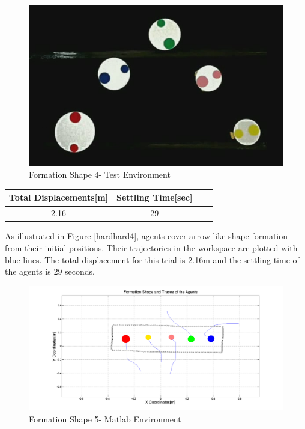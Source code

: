 \begin{figure}[H]
\caption{Formation Shape 4- Test Environment}
\centerline{\includegraphics[scale = 0.35]{6_real_hardware}}
\end{figure} 
					
\begin{center}
 \label{hardwareshape4_ref} 
\begin{tabular}{||c| c |c |c ||}
\hline
\textbf{Total Displacements[m]}  & \textbf{Settling Time[sec]}\\ 
\hline
2.16 & 29 \\
\hline
\end{tabular}
\end{center}

As illustrated in Figure \ref{hardhard4}, agents cover arrow like shape formation from their initial positions. Their trajectories in the workspace are plotted with blue lines. The total displacement for this trial is 2.16m and the settling time of the agents is 29 seconds.	
		
\begin{figure}[H]
\caption{Formation Shape 5- Matlab Environment} \label{hardhard5}
\centerline{\includegraphics[scale = 0.32]{9_hardware}}
\end{figure} 
					
